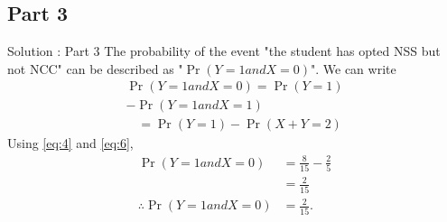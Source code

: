 \documentclass{beamer}
\providecommand{\pr}[1]{\ensuremath{\Pr\left(#1\right)}}
\begin{document}
\subsection{Part 3}

\begin{frame}{Solution : Part 3}
       The probability of the event "the student has opted NSS but not NCC" can be described as  "$\pr{Y=1 and X=0}$". 
                We can write 
                 \begin{equation}
                 \begin{split}
                   \pr{Y = 1 and X = 0} = \pr{Y = 1} \\
                                                            - \pr{ Y = 1 and X = 1}
                 \end{split}
                 \end{equation}
                 \begin{align}
                                                  &= \pr{Y = 1} - \pr{ X + Y = 2}
                 \end{align}
               Using \eqref{eq:4} and \eqref{eq:6},
                 \begin{align}
	             \pr{Y = 1 and X = 0} &=  \frac{8}{15} -  \frac{2}{5}\\
                                                    & = \frac{2}{15}\\
                   \therefore  \pr{Y = 1 and X=0} &= \frac{2}{15}.
                 \end{align}
\end{frame}
    
\end{document}
